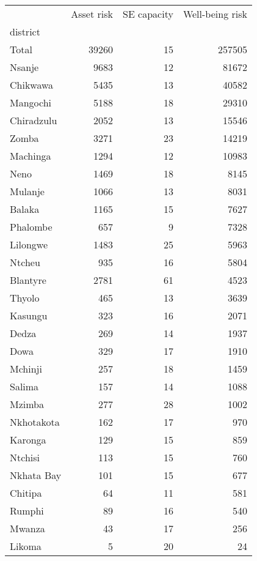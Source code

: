 \begin{tabular}{lrrr}
\toprule
{} &  Asset risk &  SE capacity &  Well-being risk \\
district   &             &              &                  \\
\midrule
Total      &       39260 &           15 &           257505 \\
Nsanje     &        9683 &           12 &            81672 \\
Chikwawa   &        5435 &           13 &            40582 \\
Mangochi   &        5188 &           18 &            29310 \\
Chiradzulu &        2052 &           13 &            15546 \\
Zomba      &        3271 &           23 &            14219 \\
Machinga   &        1294 &           12 &            10983 \\
Neno       &        1469 &           18 &             8145 \\
Mulanje    &        1066 &           13 &             8031 \\
Balaka     &        1165 &           15 &             7627 \\
Phalombe   &         657 &            9 &             7328 \\
Lilongwe   &        1483 &           25 &             5963 \\
Ntcheu     &         935 &           16 &             5804 \\
Blantyre   &        2781 &           61 &             4523 \\
Thyolo     &         465 &           13 &             3639 \\
Kasungu    &         323 &           16 &             2071 \\
Dedza      &         269 &           14 &             1937 \\
Dowa       &         329 &           17 &             1910 \\
Mchinji    &         257 &           18 &             1459 \\
Salima     &         157 &           14 &             1088 \\
Mzimba     &         277 &           28 &             1002 \\
Nkhotakota &         162 &           17 &              970 \\
Karonga    &         129 &           15 &              859 \\
Ntchisi    &         113 &           15 &              760 \\
Nkhata Bay &         101 &           15 &              677 \\
Chitipa    &          64 &           11 &              581 \\
Rumphi     &          89 &           16 &              540 \\
Mwanza     &          43 &           17 &              256 \\
Likoma     &           5 &           20 &               24 \\
\bottomrule
\end{tabular}
